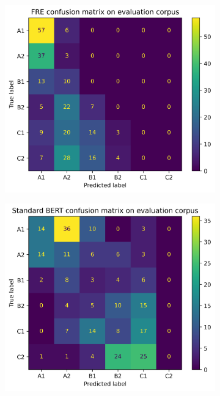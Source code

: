 \documentclass[11pt,a4paper]{article}
\begin{document}
\begin{figure}
  \begin{adjustwidth}{-3cm}{-3cm}
  \centering
  \begin{subfigure}{0.6\textwidth}
    \centering
    \includegraphics[width=1\textwidth]{figures/confusion-matrix-fre.png}
  \end{subfigure}%
  \hspace{1.cm}
  \begin{subfigure}{0.6\textwidth}
    \centering
    \includegraphics[width=1\textwidth]{figures/confusion-matrix-standard-bert.png}

\end{subfigure}
\end{adjustwidth}
\end{figure}
\end{document}
